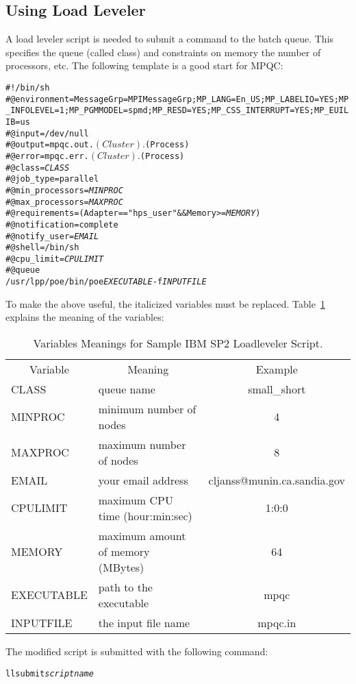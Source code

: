 \subsection{Using Load Leveler}

A load leveler script is needed to submit a command to the batch queue.
This specifies the queue (called class) and constraints on memory the
number of processors, etc.  The following template is a good start for
MPQC:

\begin{alltt}
#!/bin/sh
#@ environment = MessageGrp=MPIMessageGrp;MP_LANG=En_US;MP_LABELIO=YES;MP_INFOLEVEL=1;MP_PGMMODEL=spmd;MP_RESD=YES;MP_CSS_INTERRUPT=YES;MP_EUILIB=us
#@ input = /dev/null
#@ output = mpqc.out.$(Cluster).$(Process)
#@ error = mpqc.err.$(Cluster).$(Process)
#@ class = {\itshape CLASS}
#@ job_type = parallel
#@ min_processors = {\itshape MINPROC}
#@ max_processors = {\itshape MAXPROC}
#@ requirements =  (Adapter == "hps_user" && Memory >= {\itshape MEMORY})
#@ notification = complete
#@ notify_user = {\itshape EMAIL}
#@ shell = /bin/sh
#@ cpu_limit = {\itshape CPULIMIT}
#@ queue
/usr/lpp/poe/bin/poe {\itshape EXECUTABLE} -f {\itshape INPUTFILE}
\end{alltt}

To make the above useful, the italicized variables must be replaced.
Table~\ref{running:spvariables} explains the meaning of the variables:

\begin{table}
\caption{Variables Meanings for Sample IBM SP2 Loadleveler Script.}
\begin{center}
\begin{tabular}{lp{2.5in}c}
  \multicolumn{1}{c}{Variable}
     & \multicolumn{1}{c}{Meaning}
     & \multicolumn{1}{c}{Example} \\
  CLASS & queue name & small\_short \\
  MINPROC & minimum number of nodes & 4 \\
  MAXPROC & maximum number of nodes & 8 \\
  EMAIL & your email address & cljanss@munin.ca.sandia.gov \\
  CPULIMIT & maximum CPU time (hour:min:sec) & 1:0:0 \\
  MEMORY & maximum amount of memory (MBytes) & 64 \\
  EXECUTABLE & path to the executable & mpqc \\
  INPUTFILE & the input file name & mpqc.in \\
\end{tabular}
\end{center}
\label{running:spvariables}
\end{table}

The modified script is submitted with the following command:

\begin{alltt}
llsubmit {\itshape scriptname}
\end{alltt}

